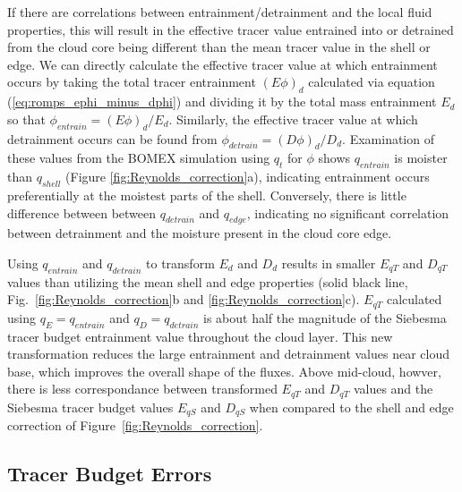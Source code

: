 \documentclass[12pt]{article}
\begin{document}
If there are correlations between entrainment/detrainment and the local 
fluid properties, this will result in the effective tracer value 
entrained into or detrained from the cloud core being different than the 
mean tracer value in the shell or edge.  We can directly calculate the 
effective tracer value at which entrainment occurs by taking the total 
tracer entrainment $(E\phi)_d$ calculated via equation 
(\ref{eq:romps_ephi_minus_dphi}) and dividing it by the total mass
entrainment $E_d$ so that $\phi_{entrain} = (E\phi)_d / E_d$.  Similarly, 
the effective tracer value at which detrainment occurs can be found from  
$\phi_{detrain} = (D\phi)_d / D_d$.  Examination of these values from the 
BOMEX simulation using $q_t$ for $\phi$ shows $q_{entrain}$ is moister than 
$q_{shell}$ (Figure \ref{fig:Reynolds_correction}a), indicating entrainment
occurs preferentially at the moistest parts of the shell.  Conversely, 
there is little difference between between $q_{detrain}$ and $q_{edge}$,
indicating no significant correlation between detrainment and the moisture
present in the cloud core edge.

Using $q_{entrain}$ and $q_{detrain}$ to transform $E_d$ and $D_d$
results in smaller $E_{q T}$ and $D_{q T}$ values than utilizing the
mean shell and edge properties (solid black line,
Fig.~\ref{fig:Reynolds_correction}b and
\ref{fig:Reynolds_correction}c).  $E_{q T}$ calculated using $q_E =
q_{entrain}$ and $q_D = q_{detrain}$ is about half the magnitude of
the Siebesma tracer budget entrainment value throughout the cloud
layer.  This new transformation reduces the large entrainment and
detrainment values near cloud base, which improves the overall shape
of the fluxes. Above mid-cloud, howver, there is less correspondance 
between transformed $E_{q T}$ and $D_{q T}$ values and the Siebesma
tracer budget values $E_{q S}$ and $D_{q S}$ when compared to the 
shell and edge correction of Figure~\ref{fig:Reynolds_correction}.


\subsection{Tracer Budget Errors}
\end{document}
